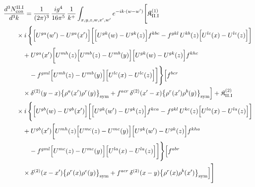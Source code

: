 \begin{align}\label{eq:H-II.I-2}
&\frac{d^{3}N^{\rm II.I}_{{\rm con}}}{d^{3}k}=\frac{1}{(2\pi)^{3}}\, \frac{ig^{4}}{16\pi^{5}}\, \frac{1}{k^{+}} \int_{x,y,z,w,x',w'}e^{-ik\cdot(w-w')}\Bigg[ \mathfrak{K}^{(1)}_{\rm II.I}\notag\\
&\quad\quad \times i\, \Bigg\{\Big[U^{ga}(w')-U^{ga}(x')\Big]\bigg[\Big[U^{gk}(w)-U^{gk}(z)\Big]f^{kbc} -f^{gkl}\, U^{kb}(z)\Big[U^{lc}(x)-U^{lc}(z)\Big]\bigg]\notag\\
&\quad\quad\quad +U^{ga}(x')\bigg[U^{mh}(z)\Big[U^{mb}(z)-U^{mb}(y)\Big]\Big[U^{gk}(w)-U^{gk}(z)\Big]f^{khc}\notag\\
&\quad\quad\quad\quad -f^{gml}\Big[U^{mb}(z)-U^{mb}(y)\Big]\Big[U^{lc}(x)-U^{lc}(z)\Big]\bigg]\Bigg\} \Big[f^{bcr}\notag\\
&\quad\quad\quad \times \delta^{(2)}(y-x)\big\{\rho^{a}(x')\rho^{r}(y)\big\}_{\rm sym} +f^{acr}\, \delta^{(2)}(x'-x)\big\{\rho^{r}(x')\rho^{b}(y)\big\}_{\rm sym}\Big] + \mathfrak{K}^{(2)}_{\rm II.I}\notag\\
&\quad\quad \times i\, \Bigg\{\Big[U^{gb}(w)-U^{gb}(x')\Big]\bigg[\Big[U^{gk}(w')-U^{gk}(z)\Big]f^{kca} -f^{gkl}\, U^{kc}(z)\Big[U^{la}(x)-U^{la}(z)\Big]\bigg]\notag\\
&\quad\quad\quad +U^{gb}(x')\bigg[U^{mh}(z)\Big[U^{mc}(z)-U^{mc}(y)\Big]\Big[U^{gk}(w')-U^{gk}(z)\Big]f^{kha}\notag\\
&\quad\quad\quad\quad -f^{gml}\Big[U^{mc}(z)-U^{mc}(y)\Big]\Big[U^{la}(x)-U^{la}(z)\Big]\bigg]\Bigg\} \Big[f^{abr}\notag\\
&\quad\quad\quad \times \delta^{(2)}(x-x')\big\{\rho^{r}(x)\rho^{c}(y)\big\}_{\rm sym} +f^{acr}\, \delta^{(2)}(x-y)\big\{\rho^{r}(x)\rho^{b}(x')\big\}_{\rm sym}\Big]\Bigg]
\end{align}
